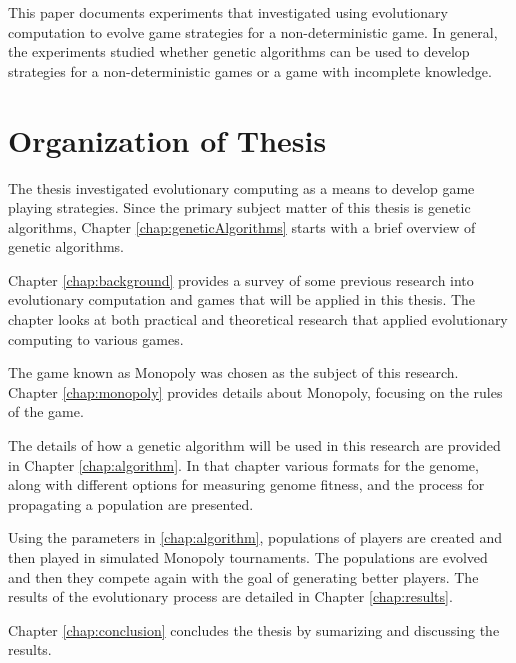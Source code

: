 This paper documents experiments that investigated using evolutionary
computation to evolve game strategies for a non-deterministic game. In general,
the experiments studied whether genetic algorithms can be used to develop
strategies for a non-deterministic games or a game with incomplete knowledge.

\section{Organization of Thesis}

The thesis investigated evolutionary computing as a means to develop game
playing strategies. Since the primary subject matter of this thesis is genetic
algorithms, Chapter \ref{chap:geneticAlgorithms} starts with a brief overview of
genetic algorithms.

Chapter \ref{chap:background} provides a survey of some previous research into
evolutionary computation and games that will be applied in this thesis. The chapter
looks at both practical and theoretical research that applied evolutionary
computing to various games.

The game known as Monopoly was chosen as the subject of this research. Chapter
\ref{chap:monopoly} provides details about Monopoly, focusing on the rules of
the game.

The details of how a genetic algorithm will be used in this research are provided
in Chapter \ref{chap:algorithm}. In that chapter various formats for the genome,
along with different options for measuring genome fitness, and the process for
propagating a population are presented.

Using the parameters in \ref{chap:algorithm}, populations of players are created
and then played in simulated Monopoly tournaments. The populations are evolved
and then they compete again with the goal of generating better players. The
results of the evolutionary process are detailed in Chapter \ref{chap:results}.

Chapter \ref{chap:conclusion} concludes the thesis by sumarizing and discussing
the results.
